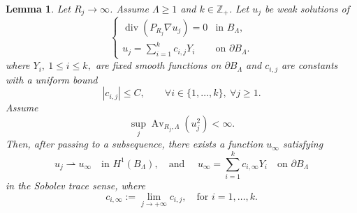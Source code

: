 \documentclass[12pt]{amsart}
\theoremstyle{plain}
\newtheorem{lemma}[theorem]{Lemma}
\theoremstyle{definition}
\theoremstyle{remark}     %
\numberwithin{equation}{section}
\begin{document}
\begin{lemma}\label{lem. convergence up to bdry}
    Let $R_j\to\infty$. Assume  $\Lambda\geq1$ and $k\in\mathbb{Z}_+$. Let $u_j$ be weak solutions of
\begin{equation}\label{eq:uj-equation boundary value}
\begin{cases}
    \operatorname{div}(P_{R_j}\nabla u_j)=0
    &\text{in }B_\Lambda,\\
    u_j=\sum_{i=1}^k c_{i,j}Y_i
    &\text{on }\partial B_\Lambda.
\end{cases}
\end{equation}
where $Y_i,\ 1\leq i\leq k,$ are fixed smooth functions on $\partial B_\Lambda$ and $c_{i,j}$ are constants with a uniform bound
\[
    |c_{i,j}|\leq C,\qquad 
    \forall i\in\{1,\ldots,k\},\  
    \forall j\geq 1.
\]
Assume
\[
    \sup_j\operatorname{Av}_{R_j,\Lambda}(u_j^2)<\infty.
\]
Then, after passing to a subsequence, there exists a function $u_\infty$
satisfying
\[
    u_j\rightharpoonup u_\infty
    \quad\text{in }H^1(B_{\Lambda}),\quad 
    \text{and }\quad 
    u_{\infty}
    =\sum_{i=1}^k c_{i,\infty}Y_i
    \quad 
    \text{on }\partial B_\Lambda
\]
in the Sobolev trace sense, where
\[
    c_{i,\infty}:=\lim_{j\to+\infty} c_{i,j},\quad \text{for } i=1,\dots,k.
\]
\end{lemma}
\end{document}
